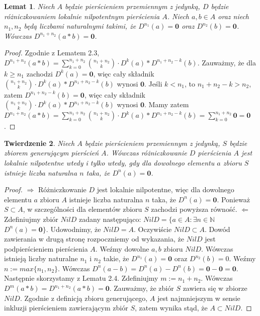 \documentclass[12pt,a4paper]{article}
\newtheorem{twr}{Twierdzenie}[section]
\newtheorem{lem}[twr]{Lemat}
\numberwithin{equation}{section}
\begin{document}
\begin{lem}
Niech $A$ będzie pierścieniem przemiennym z jedynką, $D$ będzie różniczkowaniem lokalnie nilpotentnym pierścienia $A$. Niech $a,b \in A$ oraz niech $n_1,n_2$ będą liczbami naturalnymi takimi, że $D^{n_1}(a)=\textbf{0}$ oraz $D^{n_2}(b)=\textbf{0}$. Wówczas $D^{n_1+n_2}(a*b)=\textbf{0}$.
\end{lem}
\begin{proof}
Zgodnie z Lematem 2.3, $\displaystyle D^{n_1+n_2}(a*b)= \sum_{k=0}^{n_1+n_2} \binom{n_1+n_2}{k}\cdot D^k(a)*D^{n_1+n_2-k}(b)$.
Zauważmy, że dla $k\geq n_1$ zachodzi $D^k(a)=\textbf{0}$, więc cały składnik $\binom{n_1+n_2}{k}\cdot D^k(a)*D^{n_1+n_2-k}(b)$ wynosi $\textbf{0}$. Jeśli $k < n_1$, to $n_1+n_2-k>n_2$, zatem $D^{n_1+n_2-k}(b)=\textbf{0}$, więc cały składnik $\binom{n_1+n_2}{k}\cdot D^k(a)*D^{n_1+n_2-k}(b)$ wynosi $\textbf{0}$. Mamy zatem $\displaystyle D^{n_1+n_2}(a*b)= \sum_{k=0}^{n_1+n_2} \binom{n_1+n_2}{k}\cdot D^k(a)*D^{n_1+n_2-k}(b)= \sum_{k=0}^{n_1+n_2}\textbf{0}=\textbf{0}$.
\end{proof}

\begin{twr}
Niech $A$ będzie pierścieniem przemiennym z jedynką, $S$ będzie zbiorem generującym pierścień $A$. Wówczas różniczkowanie $D$ pierścienia $A$ jest lokalnie nilpotentne wtedy i tylko wtedy, gdy dla dowolnego elementu $a$ zbioru $S$ istnieje liczba naturalna $n$ taka, że $D^n(a)=\textbf{0}$.
\end{twr}
\begin{proof}
$\Rightarrow$ Różniczkowanie $D$ jest lokalnie nilpotentne, więc dla dowolnego elementu $a$ zbioru $A$ istnieje liczba naturalna $n$ taka, że $D^n(a)=\textbf{0}$. Ponieważ $S \subset A$, w szczególności dla elementów zbioru $S$ zachodzi powyższa równość.
$\Leftarrow$ Zdefiniujmy zbiór $NilD$ zadany następująco: $NilD=\{a\in A: \exists n\in \mathbb{N}$ $D^n(a)=\textbf{0}\}$. Udowodnimy, że $NilD=A$. Oczywiście $NilD \subset A$. Dowód zawierania w drugą stronę rozpoczniemy od wykazania, że $NilD$ jest podpierścieniem pierścienia $A$. Weźmy dowolne $a,b$ zbioru $NilD$. Wówczas istnieją liczby naturalne $n_1$ i $n_2$ takie, że $D^{n_1}(a)=\textbf{0}$ oraz $D^{n_2}(b)=0$. Weźmy $n:=max\{n_1,n_2\}$. Wówczas $D^n(a-b)=D^n(a)-D^n(b)=\textbf{0}-\textbf{0}=\textbf{0}$. Następnie skorzystamy z Lematu 2.4. Zdefiniujmy $m:=n_1+n_2$. Wówczas $D^m(a*b)=D^{n_1+n_2}(a*b)=\textbf{0}$.
Zauważmy, że zbiór $S$ zawiera się w zbiorze $NilD$. Zgodnie z definicją zbioru generującego, $A$ jest najmniejszym w sensie inkluzji pierścieniem zawierającym zbiór $S$, zatem wynika stąd, że $A \subset NilD$.
\end{proof}
\end{document}
